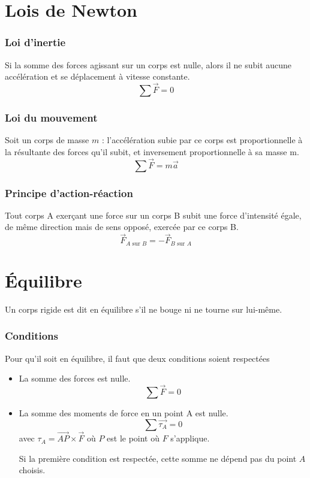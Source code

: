 \part{Lois de Newton}
\section{Loi d'inertie}
Si la somme des forces agissant sur un corps est nulle, alors il ne subit aucune
accélération et se déplacement à vitesse constante.
\[ \sum \vec{F} = 0 \]

\section{Loi du mouvement}
Soit un corps de masse $m$ : l'accélération subie par ce corps est
proportionnelle à la résultante des forces qu'il subit,
et inversement proportionnelle à sa masse m.
\[ \sum \vec{F} = m \vec{a} \]

\section{Principe d'action-réaction}
Tout corps A exerçant une force sur un corps B
subit une force d'intensité égale,
de même direction mais de sens opposé, exercée par ce corps B.
\[ \vec{F}_{A\text{ sur }B} = -\vec{F}_{B\text{ sur }A} \]

\part{Équilibre}
Un corps rigide est dit en équilibre s'il ne bouge ni ne tourne sur lui-même.
\section{Conditions}
Pour qu'il soit en équilibre, il faut que deux conditions soient respectées
\begin{itemize}
  \item La somme des forces est nulle.
    \[ \sum \vec{F} = 0 \]
  \item La somme des moments de force en un point A est nulle.
    \[ \sum \vec{\tau_A} = 0 \]
    avec
    $\tau_A = \vec{AP} \times \vec{F}$
    où $P$ est le point où $F$ s'applique.

    Si la première condition est respectée,
    cette somme ne dépend pas du point $A$ choisis.
\end{itemize}

